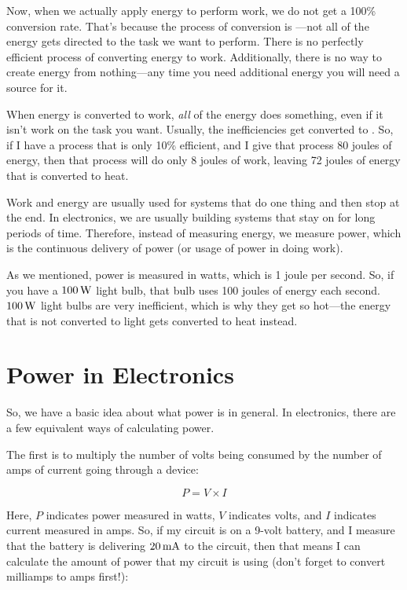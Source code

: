 Now, when we actually apply energy to perform work, we do not get a 100\% conversion rate.
That's because the process of conversion is ---not all of the energy gets directed to the task we want to perform.
There is no perfectly efficient process of converting energy to work.
Additionally, there is no way to create energy from nothing---any time you need additional energy you will need a source for it.

When energy is converted to work, \emph{all} of the energy does something, even if it isn't work on the task you want.
Usually, the inefficiencies get converted to .
So, if I have a process that is only 10\% efficient, and I give that process 80 joules of energy, then that process will do only 8 joules of work, leaving 72 joules of energy that is converted to heat.

Work and energy are usually used for systems that do one thing and then stop at the end.
In electronics, we are usually building systems that stay on for long periods of time.
Therefore, instead of measuring energy, we measure power, which is the continuous delivery of power (or usage of power in doing work).

As we mentioned, power is measured in watts, which is 1 joule per second.
So, if you have a $100\,\si{\watt}$ light bulb, that bulb uses 100 joules of energy each second.
$100\,\si{\watt}$ light bulbs are very inefficient, which is why they get so hot---the energy that is not converted to light gets converted to heat instead.

\section{Power in Electronics}
\label{secpowerelec}

So, we have a basic idea about what power is in general.
In electronics, there are a few equivalent ways of calculating power.

The first is to multiply the number of volts being consumed by the number of amps of current going through a device:

\begin{equation}
P = V\times I
\end{equation}

Here, $P$ indicates power measured in watts, $V$ indicates volts, and $I$ indicates current measured in amps.
So, if my circuit is on a 9-volt battery, and I measure that the battery is delivering $20\,\si{\milli\ampere}$ to the circuit, then that means I can calculate the amount of power that my circuit is using (don't forget to convert milliamps to amps first!):

